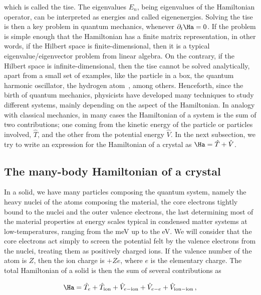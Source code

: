 \noindent which is called the \gls{tise}.
The eigenvalues $E_n$, being eigenvalues of the Hamiltonian operator, can be interpreted as energies and called eigenenergies.
Solving the \gls{tise} is then a key problem in quantum mechanics, whenever $\partial_t \Ha = 0$.
If the problem is simple enough that the Hamiltonian has a finite matrix representation, in other words, if the Hilbert space is finite-dimensional, then it is a typical eigenvalue/eigenvector problem from linear algebra.
On the contrary, if the Hilbert space is infinite-dimensional, then the \gls{tise} cannot be solved analytically, apart from a small set of examples, like the particle in a box, the quantum harmonic oscillator, the hydrogen atom~\cite{Griffiths_QM_2018}, among others.
Henceforth, since the birth of quantum mechanics, physicists have developed many techniques to study different systems, mainly depending on the aspect of the Hamiltonian.
In analogy with classical mechanics, in many cases the Hamiltonian of a system is the sum of two contributions; one coming from the kinetic energy of the particle or particles involved, $\hat{T}$, and the other from the potential energy $\hat{V}$.
In the next subsection, we try to write an expression for the Hamiltonian of a crystal as $\Ha = \hat{T} + \hat{V}$.

\subsection{The many-body Hamiltonian of a crystal}
\label{subsec:many_body_crystal_hamiltonian}

In a solid, we have many particles composing the quantum system, namely the heavy nuclei of the atoms composing the material, the core electrons tightly bound to the nuclei and the outer valence electrons, the last determining most of the material properties at energy scales typical in condensed matter systems at low-temperatures, ranging from the \unit{\milli\electronvolt} up to the \unit{\electronvolt}.
We will consider that the core electrons act simply to screen the potential felt by the valence electrons from the nuclei, treating them as positively charged ions.
If the valence number of the atom is $Z$, then the ion charge is $+Ze$, where $e$ is the elementary charge.
The total Hamiltonian of a solid is then the sum of several contributions as

\begin{equation}
    \label{eq:Hamiltonian_crystal}
    \Ha = \hat{T}_e + \hat{T}_{\mathrm{ion}} + \hat{V}_{e-\mathrm{ion}} + \hat{V}_{e-e} + \hat{V}_{\mathrm{ion-ion}}\,,
\end{equation}

